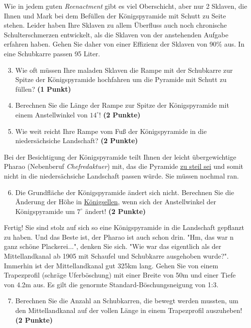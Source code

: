 \documentclass[a4paper, 9pt]{scrartcl}\usepackage[]{graphicx}\usepackage[]{xcolor}
\begin{document}
Wie in jedem guten \textit{Reenactment} gibt es viel Oberschicht, aber nur 2 Sklaven, die Ihnen und Mark bei dem Befüllen der Königspyramide mit Schutt zu Seite stehen. Leider haben Ihre Sklaven zu allem Überfluss auch noch chronische Schulterschmerzen entwickelt, als die Sklaven von der anstehenden Aufgabe erfahren haben. Gehen Sie daher von einer Effizienz der Sklaven von 90\% aus. In eine Schubkarre passen 95 Liter.

\begin{enumerate}
  \setcounter{enumi}{2}
\item Wie oft müssen Ihre maladen Sklaven die Rampe mit der Schubkarre zur Spitze der Königspyramide hochfahren um die Pyramide mit Schutt zu füllen? \textbf{(1 Punkt)}
\item Berechnen Sie die Länge der Rampe zur Spitze der Königspyramide mit einem Anstellwinkel von $14^\circ$! \textbf{(2 Punkte)}
\item Wie weit reicht Ihre Rampe vom Fuß der Königspyramide in die niedersächsiche Landschaft?  \textbf{(2 Punkte)}
\end{enumerate}

Bei der Besichtigung der Königspyramide teilt Ihnen der leicht übergewichtige Pharao (Nebenberuf \textit{Chefredaktuer}) mit, das die Pyramide \underline{zu steil sei} und somit nicht in die niedersächsiche Landschaft passen würde. Sie müssen nochmal ran.

\begin{enumerate}
  \setcounter{enumi}{5}
\item Die Grundfläche der Königspyramide ändert sich nicht. Berechnen Sie die Änderung der Höhe in \underline{Königsellen}, wenn sich der Anstellwinkel der Königspyramide um $7^\circ$ ändert!  \textbf{(2 Punkte)}
\end{enumerate}

Fertig! Sie sind stolz auf sich so eine Königspyramide in die Landschaft gepflanzt zu haben. Und das Beste ist, der Pharao ist auch schon drin. "Hm, das war n ganz schöne Plackerei...", denken Sie sich. "Wie war das eigentlich als der Mittellandkanal ab 1905 mit Schaufel und Schubkarre ausgehoben wurde?". Immerhin ist der Mittellandkanal gut 325km lang. Gehen Sie von einem Trapezprofil (schräge Uferböschung) mit einer Breite von 50m und einer Tiefe von 4.2m aus. Es gilt die genormte Standard-Böschungsneigung von 1:3.

\begin{enumerate}
  \setcounter{enumi}{6}
\item Berechnen Sie die Anzahl an Schubkarren, die bewegt werden mussten, um den Mittellandkanal auf der vollen Länge in einem Trapezprofil auszuheben! \textbf{(2 Punkte)}
\end{enumerate}
\end{document}
